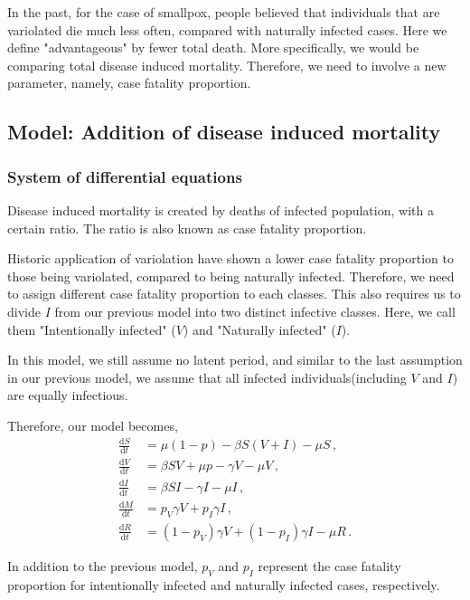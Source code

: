 \documentclass[12pt]{article}
\newcommand\dbyd[2]{\frac{\mathrm d{#1}}{\mathrm d{#2}}}
\newcommand{\pmV}{p_{V}}
\newcommand{\pmI}{p_{I}}
\begin{document}
In the past, for the case of smallpox, people believed that individuals that are variolated die much less often, compared with naturally infected cases. Here we define "advantageous" by fewer total death. More specifically, we would be comparing total disease induced mortality. Therefore, we need to involve a new parameter, namely, case fatality proportion.

\subsection{Model: Addition of disease induced mortality}\label{Newborn section}
\subsubsection{System of differential equations}
Disease induced mortality is created by deaths of infected population, with a certain ratio. The ratio is also known as case fatality proportion. 

Historic application of variolation have shown a lower case fatality proportion to those being variolated, compared to being naturally infected. Therefore, we need to assign different case fatality proportion to each classes. This also requires us to divide $I$ from our previous model into two distinct infective classes. Here, we call them "Intentionally infected" ($V$) and "Naturally infected" ($I$). 

In this model, we still assume no latent period, and similar to the last assumption in our previous model, we assume that all infected individuals(including $V$ and $I$) are equally infectious.

Therefore, our model becomes,
\begin{equation}\label{2}
\begin{split}
\dbyd{S}{t}&=\mu(1-p)- \beta S(V+I)-\mu S \,,\\
\dbyd{V}{t}&=\beta SV+\mu p-\gamma V -\mu V\,,\\
\dbyd{I}{t}&=\beta SI-\gamma I -\mu I\,,\\
\dbyd{M}{t}&=\pmV\gamma V+\pmI\gamma I\,,\\
\dbyd{R}{t}&=(1-\pmV)\gamma V+(1-\pmI)\gamma I-\mu R\,.
\end{split}
\end{equation}

In addition to the previous model, $\pmV$ and $\pmI$ represent the case fatality proportion for intentionally infected and naturally infected cases, respectively.
\end{document}

